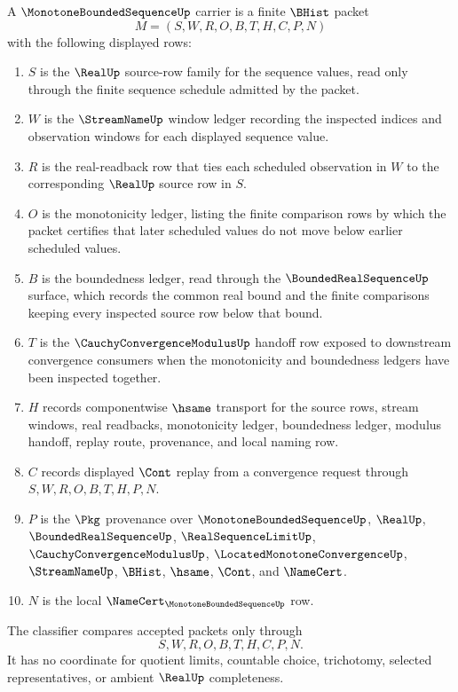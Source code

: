 \begin{definition}
\label{def:monotone-bounded-sequence-carrier}
A $\MonotoneBoundedSequenceUp$ carrier is a finite $\BHist$ packet
$$
M=(S,W,R,O,B,T,H,C,P,N)
$$
with the following displayed rows:
\begin{enumerate}
\item $S$ is the $\RealUp$ source-row family for the sequence values, read only through the finite sequence schedule admitted by the packet.
\item $W$ is the $\StreamNameUp$ window ledger recording the inspected indices and observation windows for each displayed sequence value.
\item $R$ is the real-readback row that ties each scheduled observation in $W$ to the corresponding $\RealUp$ source row in $S$.
\item $O$ is the monotonicity ledger, listing the finite comparison rows by which the packet certifies that later scheduled values do not move below earlier scheduled values.
\item $B$ is the boundedness ledger, read through the $\BoundedRealSequenceUp$ surface, which records the common real bound and the finite comparisons keeping every inspected source row below that bound.
\item $T$ is the $\CauchyConvergenceModulusUp$ handoff row exposed to downstream convergence consumers when the monotonicity and boundedness ledgers have been inspected together.
\item $H$ records componentwise $\hsame$ transport for the source rows, stream windows, real readbacks, monotonicity ledger, boundedness ledger, modulus handoff, replay route, provenance, and local naming row.
\item $C$ records displayed $\Cont$ replay from a convergence request through $S,W,R,O,B,T,H,P,N$.
\item $P$ is the $\Pkg$ provenance over $\MonotoneBoundedSequenceUp$, $\RealUp$, $\BoundedRealSequenceUp$, $\RealSequenceLimitUp$, $\CauchyConvergenceModulusUp$, $\LocatedMonotoneConvergenceUp$, $\StreamNameUp$, $\BHist$, $\hsame$, $\Cont$, and $\NameCert$.
\item $N$ is the local $\NameCert_{\MonotoneBoundedSequenceUp}$ row.
\end{enumerate}
The classifier compares accepted packets only through
$$
S,W,R,O,B,T,H,C,P,N.
$$
It has no coordinate for quotient limits, countable choice, trichotomy, selected representatives, or ambient $\RealUp$ completeness.
\end{definition}

